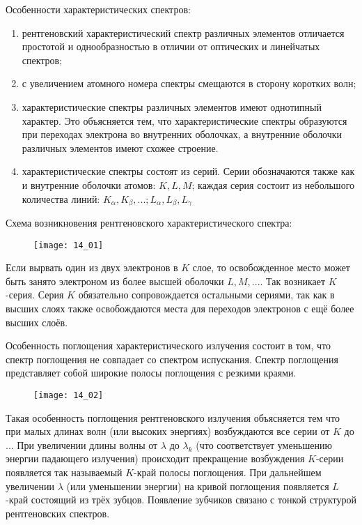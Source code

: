 Особенности характеристических спектров:
\begin{enumerate}
	\item рентгеновский характеристический спектр различных элементов 
		отличается простотой и однообразностью в отличии от оптических и 
		линейчатых спектров;
	\item с увеличением атомного номера спектры смещаются в сторону коротких 
		волн;
	\item характеристические спектры различных элементов имеют однотипный 
		характер. Это объясняется тем, что характеристические спектры 
		образуются при переходах электрона во внутренних оболочках, а 
		внутренние оболочки различных элементов имеют схожее строение.
	\item характеристические спектры состоят из серий. Серии обозначаются также 
		как и внутренние оболочки атомов: \( K, L, M\); каждая серия состоит 
		из небольшого количества линий: 
		\( K_\alpha, K_\beta, ...; L_\alpha, L_\beta, L_\gamma\)
\end{enumerate}

Схема возникновения рентгеновского характеристического спектра:

\begin{figure}[h!]
    \center
    \texttt{[image: 14\_01]}
\end{figure}

Если вырвать один из двух электронов в \( K \) слое, то освобожденное место 
может быть занято электроном из более высшей оболочки \( L, M, ... \). Так 
возникает \( K \)-серия. Серия \( K \) обязательно сопровождается остальными 
сериями, так как в высших слоях также освобождаются места для переходов 
электронов с ещё более высших слоёв.

Особенность поглощения характеристического излучения состоит в том, что спектр 
поглощения не совпадает со спектром испускания. Спектр поглощения представляет 
собой широкие полосы поглощения с резкими краями.

\begin{figure}[h!]
    \center
    \texttt{[image: 14\_02]}
\end{figure}

Такая особенность поглощения рентгеновского излучения объясняется тем что при 
малых длинах волн (или высоких энергиях) возбуждаются все серии от \( K \) до ... 
При увеличении длины волны от \( \lambda \) до \( \lambda_k \) (что соответствует 
уменьшению энергии падающего излучения) происходит прекращение возбуждения 
\( K \)-серии появляется так называемый \( K \)-край полосы поглощения. При 
дальнейшем увеличении \( \lambda \) (или уменьшении энергии) на кривой поглощения 
появляется \( L \)-край состоящий из трёх зубцов. Появление зубчиков связано с 
тонкой структурой рентгеновских спектров.

